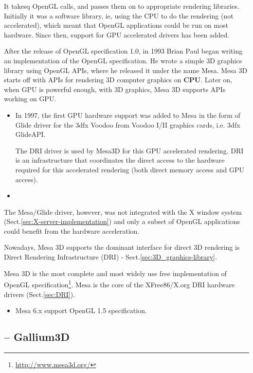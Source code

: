 It takesq OpenGL calls, and passes them on to appropriate rendering libraries.
Initially it was a software library, ie, using the CPU to do the rendering (not
accelerated), which meant that OpenGL applications could be run on most
hardware. Since then, support for GPU accelerated drivers has been added.

After the release of OpenGL specification 1.0, in 1993 Brian Paul began writing
an implementation of the OpenGL specification.
He wrote a simple 3D graphics library using OpenGL APIs, where he released it
under the name Mesa. Mesa 3D starts off with APIs for rendering 3D computer
graphics on {\bf CPU}.
Later on, when GPU is powerful enough, with 3D graphics, Mesa 3D supports APIs
working on GPU.
\begin{itemize}

  \item  In 1997, the first GPU hardware support was added to Mesa in the form
  of Glide
driver for the 3dfx Voodoo from Voodoo I/II graphics cards, i.e.
3dfx GlideAPI.

The DRI driver is used by Mesa3D for this GPU accelerated rendering. DRI is an
infrastructure that coordinates the direct access to the hardware required for
this accelerated rendering (both direct memory access and GPU access).

  \item 
\end{itemize}


The Mesa/Glide driver, however, was not integrated with the X window system
(Sect.\ref{sec:X-server-implementation}) and only a subset of OpenGL
applications could benefit from the hardware acceleration.

Nowadays, Mesa 3D supports the dominant interface for direct 3D rendering is
Direct Rendering Infrastructure (DRI) - Sect.\ref{sec:3D_graphics-library}.


Mesa 3D is the most complete and most widely use free implementation
of OpenGL specification\footnote{\url{http://www.mesa3d.org/}}. Mesa
is the core of the XFree86/X.org DRI hardware drivers (Sect.\ref{sec:DRI}).
\begin{itemize}
\item Mesa 6.x support OpenGL 1.5 specification.
\end{itemize}

\subsection{-- Gallium3D}


